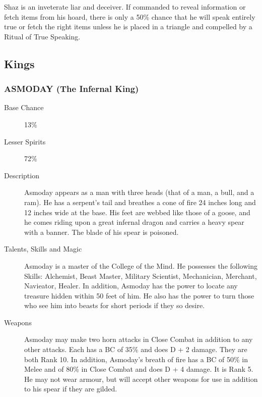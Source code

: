 \begin{multicols*}{2}
\begin{description}
\setlength\itemsep{0pt}

\item[Comments] Shaz is an inveterate liar and deceiver.  If commanded to
reveal information or fetch items from his hoard, there is only a
50\% chance that he will speak entirely true or fetch the right items
unless he is placed in a triangle and compelled by a Ritual of True
Speaking.

\end{description}

\subsection{Kings}

\subsubsection{ASMODAY (The Infernal King)}

\begin{description}

\item[Base Chance] 13\%

\item[Lesser Spirits] 72\%

\item[Description] Asmoday appears as a man with three heads (that of a
man, a bull, and a ram). He has a serpent's tail and breathes a cone
of fire 24 inches long and 12 inches wide at the base.  His feet are
webbed like those of a goose, and he comes riding upon a great
infernal dragon and carries a heavy spear with a banner. The blade of
his spear is poisoned.

\item[Talents, Skills and Magic] Asmoday is a master of the College of the Mind.  He
possesses the following Skills: Alchemist, Beast Master, Military
Scientist, Mechanician, Merchant, Navieator, Healer.  In addition,
Asmoday has the power to locate any treasure hidden within 50 feet of
him.  He also has the power to turn those who see him into beasts for
short periods if they so desire.

\item[Weapons] Asmoday may make two horn attacks in Close Combat in
addition to any other attacks.  Each has a BC of 35\% and does D + 2
damage.  They are both Rank 10.  In addition, Asmoday's breath of fire
has a BC of 50\% in Melee and of 80\% in Close Combat and does D + 4
damage.  It is Rank 5.  He may not wear armour, but will accept other
weapons for use in addition to his spear if they are gilded.


\end{description}
\end{multicols*}
